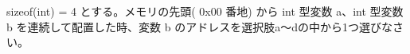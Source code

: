 sizeof(int) = 4 とする。メモリの先頭( 0x00 番地) から int 型変数 a、int 型変数 b を連続して配置した時、変数 b のアドレスを選択肢a〜dの中から1つ選びなさい。
